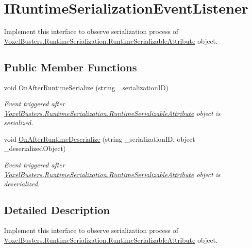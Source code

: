\hypertarget{interface_voxel_busters_1_1_runtime_serialization_1_1_i_runtime_serialization_event_listener}{}\section{I\+Runtime\+Serialization\+Event\+Listener}
\label{interface_voxel_busters_1_1_runtime_serialization_1_1_i_runtime_serialization_event_listener}


Implement this interface to observe serialization process of \hyperlink{class_voxel_busters_1_1_runtime_serialization_1_1_runtime_serializable_attribute}{Voxel\+Busters.\+Runtime\+Serialization.\+Runtime\+Serializable\+Attribute} object.  


\subsection*{Public Member Functions}
\begin{DoxyCompactItemize}
\item 
void \hyperlink{interface_voxel_busters_1_1_runtime_serialization_1_1_i_runtime_serialization_event_listener_abfb7c64c92db39873b146329d65b28d3}{On\+After\+Runtime\+Serialize} (string \+\_\+serialization\+I\+D)
\begin{DoxyCompactList}\small\item\em Event triggered after \hyperlink{class_voxel_busters_1_1_runtime_serialization_1_1_runtime_serializable_attribute}{Voxel\+Busters.\+Runtime\+Serialization.\+Runtime\+Serializable\+Attribute} object is serialized. \end{DoxyCompactList}\item 
void \hyperlink{interface_voxel_busters_1_1_runtime_serialization_1_1_i_runtime_serialization_event_listener_a173869901c67a8165ae0c3bb05e35502}{On\+After\+Runtime\+Deserialize} (string \+\_\+serialization\+I\+D, object \+\_\+deserialized\+Object)
\begin{DoxyCompactList}\small\item\em Event triggered after \hyperlink{class_voxel_busters_1_1_runtime_serialization_1_1_runtime_serializable_attribute}{Voxel\+Busters.\+Runtime\+Serialization.\+Runtime\+Serializable\+Attribute} object is deserialized. \end{DoxyCompactList}\end{DoxyCompactItemize}


\subsection{Detailed Description}
Implement this interface to observe serialization process of \hyperlink{class_voxel_busters_1_1_runtime_serialization_1_1_runtime_serializable_attribute}{Voxel\+Busters.\+Runtime\+Serialization.\+Runtime\+Serializable\+Attribute} object. 



